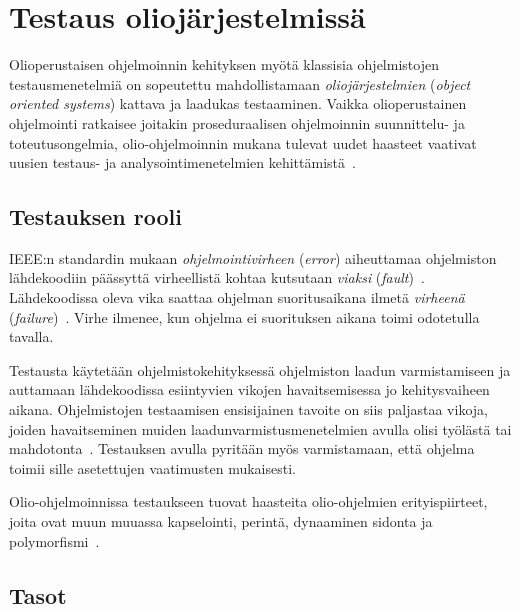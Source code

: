 \documentclass[finnish, grading]{tktltiki2}
\theoremstyle{definition}
\theoremstyle{remark}
\begin{document}


\section{Testaus oliojärjestelmissä}

Olioperustaisen ohjelmoinnin kehityksen myötä klassisia ohjelmistojen testausmenetelmiä on sopeutettu mahdollistamaan \textit{oliojärjestelmien} (\textit{object oriented systems}) kattava ja laadukas testaaminen. Vaikka olioperustainen ohjelmointi ratkaisee joitakin proseduraalisen ohjelmoinnin suunnittelu- ja toteutusongelmia, olio-ohjelmoinnin mukana tulevat uudet haasteet vaativat uusien testaus- ja analysointimenetelmien kehittämistä~\cite[s. 86]{Mariani:Pezze:2008}. 

\subsection{Testauksen rooli}

IEEE:n standardin mukaan \textit{ohjelmointivirheen} (\textit{error}) aiheuttamaa ohjelmiston lähdekoodiin päässyttä virheellistä kohtaa kutsutaan \textit{viaksi} (\textit{fault})~\cite[s. 5]{IEEE:2009}. Lähdekoodissa oleva vika saattaa ohjelman suoritusaikana ilmetä \textit{virheenä} (\textit{failure})~\cite[s. 5]{IEEE:2009}. Virhe ilmenee, kun ohjelma ei suorituksen aikana toimi odotetulla tavalla.

Testausta käytetään ohjelmistokehityksessä ohjelmiston laadun varmistamiseen ja auttamaan lähdekoodissa esiintyvien vikojen havaitsemisessa jo kehitysvaiheen aikana. Ohjelmistojen testaamisen ensisijainen tavoite on siis paljastaa vikoja, joiden havaitseminen muiden laadunvarmistusmenetelmien avulla olisi työlästä tai mahdotonta~\cite[s. 59]{Binder:1999}. Testauksen avulla pyritään myös varmistamaan, että ohjelma toimii sille asetettujen vaatimusten mukaisesti. %

Olio-ohjelmoinnissa testaukseen tuovat haasteita olio-ohjelmien erityispiirteet, joita ovat muun muuassa kapselointi, perintä, dynaaminen sidonta ja polymorfismi~\cite[s. 86]{Mariani:Pezze:2008}.

\subsection{Tasot}
\end{document}
